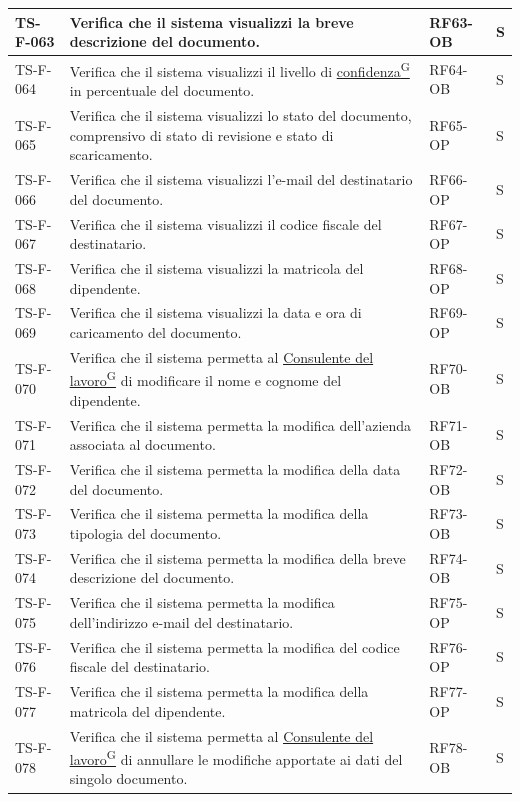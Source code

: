 \documentclass[a4paper,12pt]{article}
\providecommand{\glslink}[2]{\href{https://alittlebyte-19.github.io/Documentazione/glossario.html\#gls-#1}{\underline{#2}\textsuperscript{\scriptsize G}}}
\begin{document}
\begin{longtable}{|p{2.2cm}|p{9.5cm}|p{2.3cm}|p{1.5cm}|}
    \hline
    TS-F-063 & Verifica che il sistema visualizzi la breve descrizione del documento. & RF63-OB & S \\
    \hline
    TS-F-064 & Verifica che il sistema visualizzi il livello di \glslink{confidenza-confidence-score}{confidenza} in percentuale del documento. & RF64-OB & S \\
    \hline
    TS-F-065 & Verifica che il sistema visualizzi lo stato del documento, comprensivo di stato di revisione e stato di scaricamento. & RF65-OP & S \\
    \hline
    TS-F-066 & Verifica che il sistema visualizzi l'e-mail del destinatario del documento. & RF66-OP & S \\
    \hline
    TS-F-067 & Verifica che il sistema visualizzi il codice fiscale del destinatario. & RF67-OP & S \\
    \hline
    TS-F-068 & Verifica che il sistema visualizzi la matricola del dipendente. & RF68-OP & S \\
    \hline
    TS-F-069 & Verifica che il sistema visualizzi la data e ora di caricamento del documento. & RF69-OP & S \\
    \hline
    TS-F-070 & Verifica che il sistema permetta al \glslink{consulente-del-lavoro-cdl}{Consulente del lavoro} di modificare il nome e cognome del dipendente. & RF70-OB & S \\
    \hline
    TS-F-071 & Verifica che il sistema permetta la modifica dell'azienda associata al documento. & RF71-OB & S \\
    \hline
    TS-F-072 & Verifica che il sistema permetta la modifica della data del documento. & RF72-OB & S \\
    \hline
    TS-F-073 & Verifica che il sistema permetta la modifica della tipologia del documento. & RF73-OB & S \\
    \hline
    TS-F-074 & Verifica che il sistema permetta la modifica della breve descrizione del documento. & RF74-OB & S \\
    \hline
    TS-F-075 & Verifica che il sistema permetta la modifica dell'indirizzo e-mail del destinatario. & RF75-OP & S \\
    \hline
    TS-F-076 & Verifica che il sistema permetta la modifica del codice fiscale del destinatario. & RF76-OP & S \\
    \hline
    TS-F-077 & Verifica che il sistema permetta la modifica della matricola del dipendente. & RF77-OP & S \\
    \hline
    TS-F-078 & Verifica che il sistema permetta al \glslink{consulente-del-lavoro-cdl}{Consulente del lavoro} di annullare le modifiche apportate ai dati del singolo documento. & RF78-OB & S \\

\end{longtable}
\end{document}
